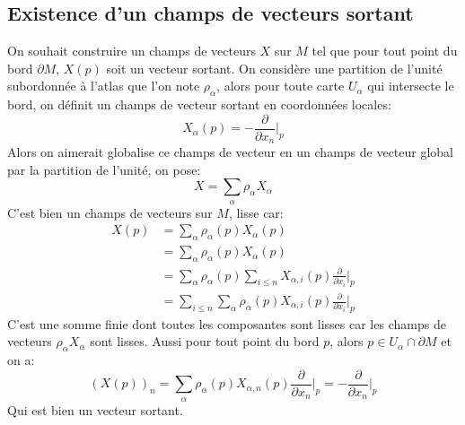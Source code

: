    \subsection*{Existence d'un champs de vecteurs sortant}
      On souhait construire un champs de vecteurs $X$ sur $M$ tel que pour tout point du bord $\partial M$, $X(p)$ soit un vecteur sortant. On considère une partition de l'unité subordonnée à l'atlas que l'on note $\rho_\alpha$, alors pour toute carte $U_\alpha$ qui intersecte le bord, on définit un champs de vecteur sortant en coordonnées locales:
      $$
         X_\alpha(p) = -\frac{\partial}{\partial x_n}\bigg|_p
      $$
      Alors on aimerait globalise ce champs de vecteur en un champs de vecteur global par la partition de l'unité, on pose:
      $$
         X = \sum_\alpha \rho_\alpha X_\alpha
      $$
      C'est bien un champs de vecteurs sur $M$, lisse car: 
      \begin{align*}
         X(p) &= \sum_\alpha \rho_\alpha(p) X_\alpha(p) \\
         &= \sum_\alpha \rho_\alpha(p) X_\alpha(p)\\
         &= \sum_\alpha \rho_\alpha(p) \sum_{i \leq n}X_{\alpha, i}(p)\frac{\partial}{\partial x_i}\bigg|_p\\
         &= \sum_{i \leq n}\sum_\alpha \rho_\alpha(p)X_{\alpha, i}(p)\frac{\partial}{\partial x_i}\bigg|_p
      \end{align*}
      C'est une somme finie dont toutes les composantes sont lisses car les champs de vecteurs $\rho_\alpha X_\alpha$ sont lisses. Aussi pour tout point du bord $p$, alors \( p \in U_\alpha \cap \partial M \) et on a:
      $$
         (X(p))_n = \sum_\alpha \rho_\alpha(p) X_{\alpha, n}(p)\frac{\partial}{\partial x_n}\bigg|_p = -\frac{\partial}{\partial x_n}\bigg|_p 
      $$
      Qui est bien un vecteur sortant.\<
